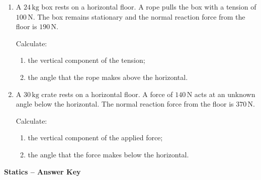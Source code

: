 \documentclass[12pt,a4paper]{article}
\begin{document}
\begin{enumerate}[leftmargin=*, itemsep=1em]
Calculate:

\begin{enumerate}[label=(\alph*)]
    \item the horizontal force acting to the left;
    \item the normal reaction force from the floor.
\end{enumerate}

\vspace{0.8cm}

\item
A \(24\,\mathrm{kg}\) box rests on a horizontal floor. A rope pulls the box with a tension of \(100\,\mathrm{N}\). The box remains stationary and the normal reaction force from the floor is \(190\,\mathrm{N}\).

Calculate:

\begin{enumerate}[label=(\alph*)]
    \item the vertical component of the tension;
    \item the angle that the rope makes above the horizontal.
\end{enumerate}

\vspace{0.8cm}

\item
A \(30\,\mathrm{kg}\) crate rests on a horizontal floor. A force of \(140\,\mathrm{N}\) acts at an unknown angle below the horizontal. The normal reaction force from the floor is \(370\,\mathrm{N}\).

Calculate:

\begin{enumerate}[label=(\alph*)]
    \item the vertical component of the applied force;
    \item the angle that the force makes below the horizontal.
\end{enumerate}

\end{enumerate}

\newpage

\begin{center}
    {\Large\textbf{Statics -- Answer Key}}
\end{center}

\vspace{0.5cm}
\end{document}
